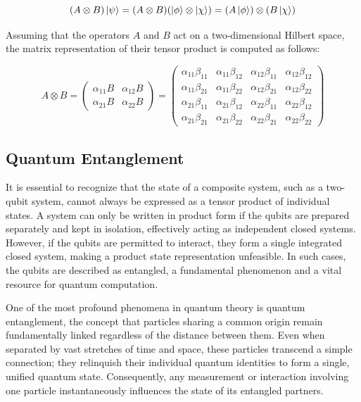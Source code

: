 \documentclass[en]{dimscthesis}
\begin{document}
\begin{equation}
	(A \otimes B) \ket{\psi} = (A \otimes B)(\ket{\phi} \otimes \ket{\chi}) = (A\ket{\phi}) \otimes (B\ket{\chi})
	\label{eq:comp_systems}
\end{equation}

Assuming that the operators $A$ and $B$ act on a two-dimensional Hilbert space, the matrix representation of their tensor product is computed as follows:

\begin{equation}
	A \otimes B 
	= 	\begin{pmatrix} 
		\alpha_{11}B &  \alpha_{12}B\\ 
		\alpha_{21}B &  \alpha_{22}B
	\end{pmatrix}  
	= 	\begin{pmatrix} 
	\alpha_{11}\beta_{11} &  \alpha_{11}\beta_{12} & \alpha_{12}\beta_{11} &\alpha_{12}\beta_{12}\\ 
	\alpha_{11}\beta_{21} &  \alpha_{11}\beta_{22} & \alpha_{12}\beta_{21} &\alpha_{12}\beta_{22}\\
	\alpha_{21}\beta_{11} &  \alpha_{21}\beta_{12} & \alpha_{22}\beta_{11} &\alpha_{22}\beta_{12}\\
	\alpha_{21}\beta_{21} &  \alpha_{21}\beta_{22} & \alpha_{22}\beta_{21} &\alpha_{22}\beta_{22}
	\end{pmatrix}
	\label{eq:comp_systems_matrix}
\end{equation}

\subsection{Quantum Entanglement} \label{entanglement}

It is essential to recognize that the state of a composite system, such as a two-qubit system, cannot always be expressed as a tensor product of individual states. A system can only be written in product form if the qubits are prepared separately and kept in isolation, effectively acting as independent closed systems. However, if the qubits are permitted to interact, they form a single integrated closed system, making a product state representation unfeasible. In such cases, the qubits are described as entangled, a fundamental phenomenon and a vital resource for quantum computation.

One of the most profound phenomena in quantum theory is quantum entanglement, the concept that particles sharing a common origin remain fundamentally linked regardless of the distance between them. Even when separated by vast stretches of time and space, these particles transcend a simple connection; they relinquish their individual quantum identities to form a single, unified quantum state. Consequently, any measurement or interaction involving one particle instantaneously influences the state of its entangled partners.
\end{document}
